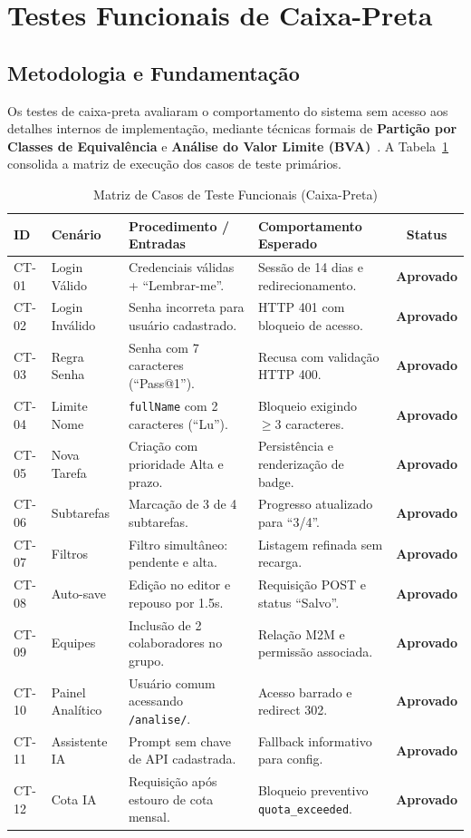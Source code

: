\documentclass[12pt]{article}
\begin{document}
\section{Testes Funcionais de Caixa-Preta}

\subsection{Metodologia e Fundamentação}
Os testes de caixa-preta avaliaram o comportamento do sistema sem acesso aos detalhes internos de implementação, mediante técnicas formais de \textbf{Partição por Classes de Equivalência} e \textbf{Análise do Valor Limite (BVA)}~\cite{sommerville2019}. A Tabela~\ref{tab:caixa_preta} consolida a matriz de execução dos casos de teste primários.

\begin{table}[htbp]
\centering
\caption{Matriz de Casos de Teste Funcionais (Caixa-Preta)}
\label{tab:caixa_preta}
\small
\begin{tabular}{@{}p{1.2cm}p{3.0cm}p{4.2cm}p{4.0cm}c@{}}
\toprule
\textbf{ID} & \textbf{Cenário} & \textbf{Procedimento / Entradas} & \textbf{Comportamento Esperado} & \textbf{Status} \\ \midrule
CT-01 & Login Válido & Credenciais válidas + ``Lembrar-me''. & Sessão de 14 dias e redirecionamento. & \textbf{Aprovado} \\
CT-02 & Login Inválido & Senha incorreta para usuário cadastrado. & HTTP 401 com bloqueio de acesso. & \textbf{Aprovado} \\
CT-03 & Regra Senha & Senha com 7 caracteres (``Pass@1''). & Recusa com validação HTTP 400. & \textbf{Aprovado} \\
CT-04 & Limite Nome & \texttt{fullName} com 2 caracteres (``Lu''). & Bloqueio exigindo $\ge 3$ caracteres. & \textbf{Aprovado} \\
CT-05 & Nova Tarefa & Criação com prioridade Alta e prazo. & Persistência e renderização de badge. & \textbf{Aprovado} \\
CT-06 & Subtarefas & Marcação de 3 de 4 subtarefas. & Progresso atualizado para ``3/4''. & \textbf{Aprovado} \\
CT-07 & Filtros & Filtro simultâneo: pendente e alta. & Listagem refinada sem recarga. & \textbf{Aprovado} \\
CT-08 & Auto-save & Edição no editor e repouso por 1.5s. & Requisição POST e status ``Salvo''. & \textbf{Aprovado} \\
CT-09 & Equipes & Inclusão de 2 colaboradores no grupo. & Relação M2M e permissão associada. & \textbf{Aprovado} \\
CT-10 & Painel Analítico & Usuário comum acessando \texttt{/analise/}. & Acesso barrado e redirect 302. & \textbf{Aprovado} \\
CT-11 & Assistente IA & Prompt sem chave de API cadastrada. & Fallback informativo para config. & \textbf{Aprovado} \\
CT-12 & Cota IA & Requisição após estouro de cota mensal. & Bloqueio preventivo \texttt{quota\_exceeded}. & \textbf{Aprovado} \\ \bottomrule
\end{tabular}
\end{table}
\end{document}
